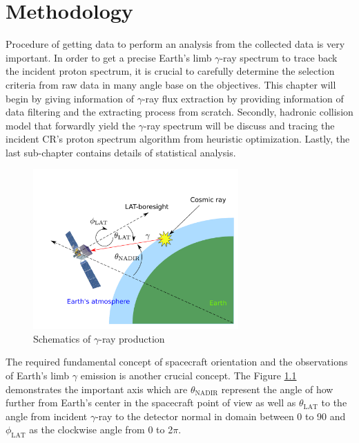\chapter{Methodology}

Procedure of getting data to perform an analysis
from the collected data is very important. In order 
to get a precise Earth's limb $\gamma$-ray spectrum to
trace back the incident proton spectrum, it is crucial 
to carefully determine the selection criteria from raw 
data in many angle base on the objectives. This chapter 
will begin by giving information of $\gamma$-ray flux extraction 
by providing information of data filtering and 
the extracting process from scratch. Secondly, hadronic collision 
model that forwardly yield the $\gamma$-ray spectrum 
will be discuss and tracing the incident CR's proton 
spectrum algorithm from heuristic optimization. Lastly,
the last sub-chapter contains details of statistical analysis.

\begin{figure}[h!]
    \centering
    \includegraphics[width=0.7\textwidth]{content/methodology/figures/gamma_production_schematic}
    \caption{Schematics of $\gamma$-ray production}
    \label{fig:gamma_emis_sp}
\end{figure}

The required fundamental concept of spacecraft orientation and 
the observations of Earth's limb $\gamma$ emission is another crucial
concept. The Figure \ref{fig:gamma_emis_sp} demonstrates the important
axis which are $\theta_\text{NADIR}$ represent the angle of how further
from Earth's center in the spacecraft point of view as well as 
$\theta_\text{LAT}$ to the angle from incident $\gamma$-ray to the 
detector normal in domain between 0 to 90\textdegree
and $\phi_\text{LAT}$ as the clockwise angle from 0 to 2$\pi$.


